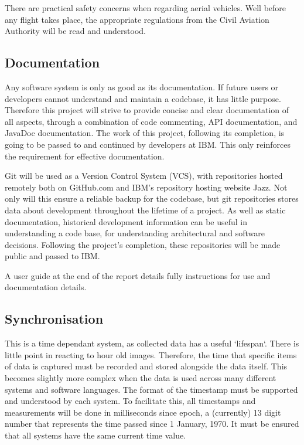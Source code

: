 \documentclass{article}
\begin{document}
There are practical safety concerns when regarding aerial vehicles. Well before any flight takes place, the appropriate regulations from the Civil Aviation Authority will be read and understood.

\subsection{Documentation}
Any software system is only as good as its documentation. If future users or developers cannot understand and maintain a codebase, it has little purpose. Therefore this project will strive to provide concise and clear documentation of all aspects, through a combination of code commenting, API documentation, and JavaDoc documentation. The work of this project, following its completion, is going to be passed to and continued by developers at IBM. This only reinforces the requirement for effective documentation.

Git will be used as a Version Control System (VCS), with repositories hosted remotely both on GitHub.com and IBM's repository hosting website Jazz\cite{jazz}. Not only will this ensure a reliable backup for the codebase, but git repositories stores data about development throughout the lifetime of a project. As well as static documentation, historical development information can be useful in understanding a code base, for understanding architectural and software decisions\cite{crimeScene}. Following the project's completion, these repositories will be made public and passed to IBM.

A user guide at the end of the report details fully instructions for use and documentation details.

\subsection{Synchronisation}
This is a time dependant system, as collected data has a useful `lifespan`. There is little point in reacting to hour old images. Therefore, the time that specific items of data is captured must be recorded and stored alongside the data itself. This becomes slightly more complex when the data is used across many different systems and software languages. The format of the timestamp must be supported and understood by each system. To facilitate this, all timestamps and measurements will be done in milliseconds since epoch, a (currently) 13 digit number that represents the time passed since 1 January, 1970. It must be ensured that all systems have the same current time value.
\end{document}
